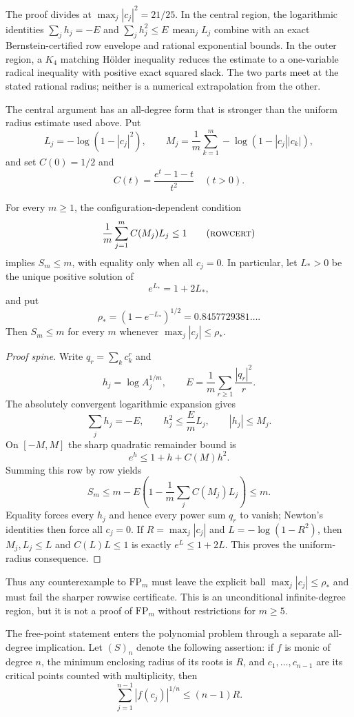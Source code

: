 \documentclass[11pt]{article}
\begin{document}
The proof divides at $\max_j|c_j|^2=21/25$.  In the central region, the
logarithmic identities $\sum_j h_j=-E$ and
$\sum_j h_j^2\le E\,\operatorname{mean}_j L_j$ combine with an exact
Bernstein-certified row envelope and rational exponential bounds.  In the
outer region, a $K_4$ matching H\"older inequality reduces the estimate to a
one-variable radical inequality with positive exact squared slack.  The two
parts meet at the stated rational radius; neither is a numerical extrapolation
from the other.

The central argument has an all-degree form that is stronger than the uniform
radius estimate used above.  Put
\[
 L_j=-\log(1-|c_j|^2),\qquad
 M_j=\frac1m\sum_{k=1}^m-\log(1-|c_j||c_k|),
\]
and set $C(0)=1/2$ and
\[
 C(t)=\frac{e^t-1-t}{t^2}\quad(t>0).
\]

\begin{theorem}
\label{res:fp-central-radius}
For every $m\ge1$, the configuration-dependent condition
\[
 \frac1m\sum_{j=1}^m C(M_j)L_j\le1
 \tag{\textsc{rowcert}}
\]
implies $S_m\le m$, with equality only when all $c_j=0$.  In particular,
let $L_*>0$ be the unique positive solution of
\[
 e^{L_*}=1+2L_*,
\]
and put
\[
 \rho_*=(1-e^{-L_*})^{1/2}=0.8457729381\ldots .
\]
Then $S_m\le m$ for every $m$ whenever
$\max_j|c_j|\le\rho_*$.
\end{theorem}

\begin{proof}[Proof spine]
Write $q_r=\sum_kc_k^r$ and
\[
 h_j=\log A_j^{1/m},\qquad
 E=\frac1m\sum_{r\ge1}\frac{|q_r|^2}{r}.
\]
The absolutely convergent logarithmic expansion gives
\[
 \sum_jh_j=-E,\qquad
 h_j^2\le\frac EmL_j,\qquad |h_j|\le M_j.
\]
On $[-M,M]$ the sharp quadratic remainder bound is
\[
 e^h\le1+h+C(M)h^2.
\]
Summing this row by row yields
\[
 S_m\le m-E\left(1-\frac1m\sum_jC(M_j)L_j\right)\le m.
\]
Equality forces every $h_j$ and hence every power sum $q_r$ to vanish;
Newton's identities then force all $c_j=0$.  If
$R=\max_j|c_j|$ and $L=-\log(1-R^2)$, then
$M_j,L_j\le L$ and $C(L)L\le1$ is exactly
$e^L\le1+2L$.  This proves the uniform-radius consequence.
\end{proof}

Thus any counterexample to $\mathrm{FP}_m$ must leave the explicit ball
$\max_j|c_j|\le\rho_*$ and must fail the sharper rowwise certificate.  This
is an unconditional infinite-degree region, but it is not a proof of
$\mathrm{FP}_m$ without restrictions for $m\ge5$.

The free-point statement enters the polynomial problem through a separate
all-degree implication.  Let $(S)_n$ denote the following assertion: if $f$ is
monic of degree $n$, the minimum enclosing radius of its roots is $R$, and
$c_1,\ldots,c_{n-1}$ are its critical points counted with multiplicity, then
\[
  \sum_{j=1}^{n-1}|f(c_j)|^{1/n}\le(n-1)R.
\]
\end{document}
